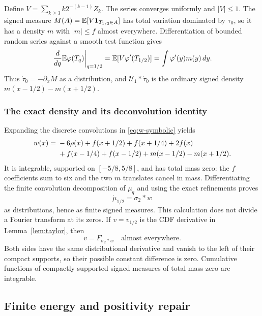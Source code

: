 \documentclass[11pt,letterpaper]{article}
\theoremstyle{remark}\newtheorem{remark}[theorem]{Remark}
\newcommand{\Un}{\mathcal U}\newcommand{\Law}{\mathcal L}
\begin{document}
Define $V=\sum_{k\ge3}k2^{-(k-1)}Z_k$. The series converges uniformly and $|V|\le1$. The signed measure $M(A)=\mathbb E[V\mathbf1_{T_{1/2}\in A}]$ has total variation dominated by $\tau_0$, so it has a density $m$ with $|m|\le f$ almost everywhere. Differentiation of bounded random series against a smooth test function gives
\[
\left.\frac{d}{dq}\mathbb E\varphi(T_q)\right|_{q=1/2}
=\mathbb E[V\varphi'(T_{1/2})]=\int\varphi'(y)m(y)\,dy.
\]
Thus $\dot\tau_0=-\partial_xM$ as a distribution, and $\Un_1*\dot\tau_0$ is the ordinary signed density $m(x-1/2)-m(x+1/2)$.

\subsubsection{The exact density and its deconvolution identity}
Expanding the discrete convolutions in \eqref{eq:w-symbolic} yields
\begin{align}\label{eq:w-density}
w(x)={}&-6\rho(x)+f(x+1/2)+f(x+1/4)+2f(x)\notag\\
&+f(x-1/4)+f(x-1/2)+m(x-1/2)-m(x+1/2).
\end{align}
It is integrable, supported on $[-5/8,5/8]$, and has total mass zero: the $f$ coefficients sum to six and the two $m$ translates cancel in mass. Differentiating the finite convolution decomposition of $\mu_q$ and using the exact refinements proves
\[
\dot\mu_{1/2}=\sigma_2*w
\]
as distributions, hence as finite signed measures. This calculation does not divide a Fourier transform at its zeros. If $v=v_{1/2}$ is the CDF derivative in Lemma~\ref{lem:taylor}, then
\begin{equation}\label{eq:v-signed}
v=F_{\sigma_2*w}\quad\text{almost everywhere}.
\end{equation}
Both sides have the same distributional derivative and vanish to the left of their compact supports, so their possible constant difference is zero. Cumulative functions of compactly supported signed measures of total mass zero are integrable.

\subsection{Finite energy and positivity repair}\label{sec:repair}
\end{document}
